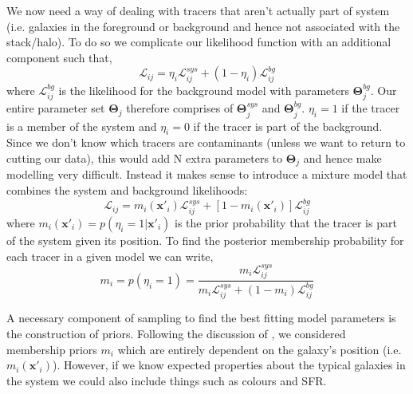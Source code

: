 We now need a way of dealing with tracers that aren't actually part of system (i.e. galaxies in the foreground or background and hence not associated with the stack/halo). To do so we complicate our likelihood function with an additional component such that, 
\begin{equation}
\mathcal{L}_{ij} = \eta_{i}\mathcal{L}^{sys}_{ij} + (1-\eta_i)\mathcal{L}_{ij}^{bg}
\end{equation}
where $\mathcal{L}^{bg}_{ij}$ is the likelihood for the background model with parameters $\boldsymbol{\Theta}^{bg}_{j}$. Our entire parameter set $\boldsymbol{\Theta}_{j}$ therefore comprises of $\boldsymbol{\Theta}^{sys}_{j}$ and $\boldsymbol{\Theta}^{bg}_{j}$. $\eta_{i} = 1$ if the tracer is a member of the system and $\eta_{i} = 0$ if the tracer is part of the background. Since we don't know which tracers are contaminants (unless we want to return to cutting our data), this would add N extra parameters to $\boldsymbol{\Theta}_{j}$ and hence make modelling very difficult. Instead it makes sense to introduce a mixture model that combines the system and background likelihoods:
\begin{equation}
\mathcal{L}_{ij} = m_{i}(\boldsymbol{x}'_{i})\mathcal{L}^{sys}_{ij} + [1 - m_{i}(\boldsymbol{x}'_{i})]\mathcal{L}^{bg}_{ij}
\end{equation}
where $m_{i}(\boldsymbol{x}'_{i}) = p(\eta_{i} = 1| \boldsymbol{x}'_{i})$ is the prior probability that the tracer is part of the system given its position. To find the posterior membership probability for each tracer in a given model we can write,
\begin{equation}
m_{i} = p(\eta_i = 1) = \frac{m_{i}\mathcal{L}_{ij}^{sys}}{m_{i}\mathcal{L}_{ij}^{sys} + (1 - m_i)\mathcal{L}^{bg}_{ij}}
\end{equation}

A necessary component of sampling to find the best fitting model parameters is the construction of priors. Following the discussion of \citet{watkins2013}, we considered membership priors $m_i$ which are entirely dependent on the galaxy's position (i.e. $m_{i}(\boldsymbol{x}'_{i})$). However, if we know expected properties about the typical galaxies in the system we could also include things such as colours and SFR. 

